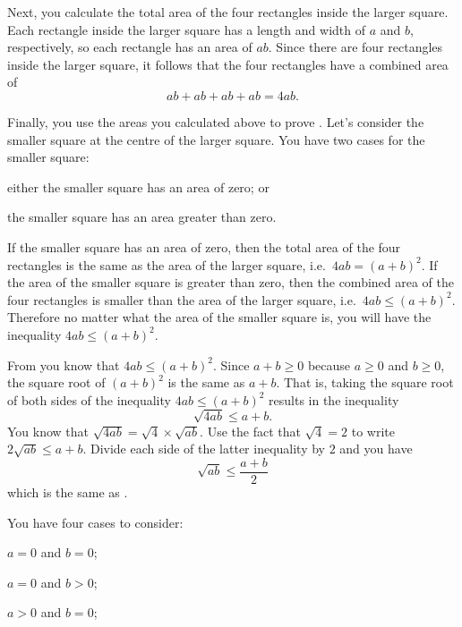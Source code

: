 \documentclass[a4paper,oneside,12pt]{article}
\begin{document}
\begin{problem}
{\begin{solution}
Next, you calculate the total area of the four rectangles inside the
larger square.  Each rectangle inside the larger square has a length
and width of $a$ and $b$, respectively, so each rectangle has an area
of $ab$.  Since there are four rectangles inside the larger square, it
follows that the four rectangles have a combined area of
\[
ab + ab + ab + ab
=
4ab.
\]

Finally, you use the areas you calculated above to prove
.  Let's consider the smaller square at
the centre of the larger square.  You have two cases for the smaller
square:
\begin{packedenumeral}
\item either the smaller square has an area of zero; or

\item the smaller square has an area greater than zero.
\end{packedenumeral}
If the smaller square has an area of zero, then the total area of the
four rectangles is the same as the area of the larger square,
i.e.~$4ab = (a + b)^2$.  If the area of the smaller square is greater
than zero, then the combined area of the four rectangles is smaller
than the area of the larger square, i.e.~$4ab \leq (a + b)^2$.
Therefore no matter what the area of the smaller square is, you will
have the inequality $4ab \leq (a + b)^2$.

From  you know that $4ab \leq (a + b)^2$.
Since $a + b \geq 0$ because $a \geq 0$ and $b \geq 0$, the square
root of $(a + b)^2$ is the same as $a + b$.  That is, taking the
square root of both sides of the inequality $4ab \leq (a + b)^2$
results in the inequality
\[
\sqrt{4ab}
\leq
a + b.
\]
You know that $\sqrt{4ab} = \sqrt{4} \times \sqrt{ab}$.  Use the fact
that $\sqrt{4} = 2$ to write $2\sqrt{ab} \leq a + b$.  Divide each
side of the latter inequality by $2$ and you have
\[
\sqrt{ab}
\leq
\frac{a + b}{2}
\]
which is the same as .

You have four cases to consider:
\begin{packedenumeral}
\item $a = 0$ and $b = 0$;

\item $a = 0$ and $b > 0$;

\item $a > 0$ and $b = 0$;


\end{packedenumeral}
\end{solution}}
\end{problem}
\end{document}
